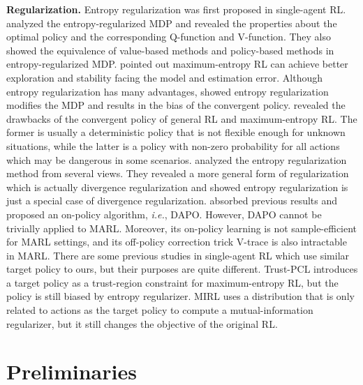\documentclass{article}
\begin{document}
\textbf{Regularization.} Entropy regularization was first proposed in single-agent RL. \citet{SAC-theory} analyzed the entropy-regularized MDP and revealed the properties about the optimal policy and the corresponding Q-function and V-function. They also showed the equivalence of value-based methods and policy-based methods in entropy-regularized MDP. \citet{SAC} pointed out maximum-entropy RL can achieve better exploration and stability facing the model and estimation error. Although entropy regularization has many advantages, \citet{whatisquestion} showed entropy regularization modifies the MDP and results in the bias of the convergent policy. \citet{regularizer} revealed the drawbacks of the convergent policy of general RL and maximum-entropy RL. The former is usually a deterministic policy \citep{RLBOOK} that is not flexible enough for unknown situations, while the latter is a policy with non-zero probability for all actions which may be dangerous in some scenarios. \citet{unifiedview} analyzed the entropy regularization method from several views. They revealed a more general form of regularization which is actually divergence regularization and showed entropy regularization is just a special case of divergence regularization. \citet{DIV-AUG} absorbed previous results and proposed an on-policy algorithm, \textit{i.e.}, DAPO. However, DAPO cannot be trivially applied to MARL. Moreover, its on-policy learning is not sample-efficient for MARL settings, and its off-policy correction trick V-trace \citep{V-trace} is also intractable in MARL. There are some previous studies in single-agent RL which use similar target policy to ours, but their purposes are quite different. Trust-PCL \citep{Trust-PCL} introduces a target policy as a trust-region constraint for maximum-entropy RL, but the policy is still biased by entropy regularizer. MIRL \citep{MIRL} uses a distribution that is only related to actions as the target policy to compute a mutual-information regularizer, but it still changes the objective of the original RL. 




\section{Preliminaries}
\end{document}
